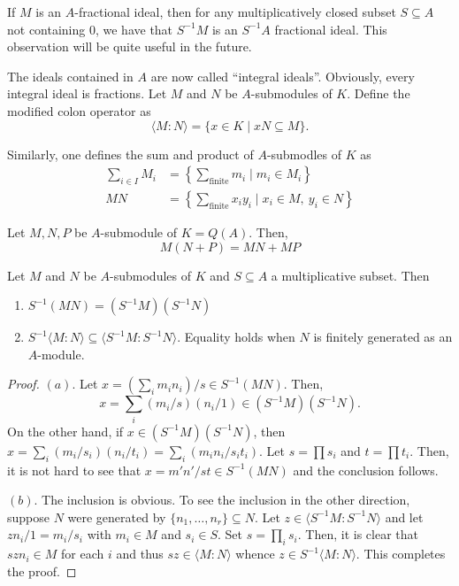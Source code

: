 \begin{remark}
    If $M$ is an $A$-fractional ideal, then for any multiplicatively closed subset $S\subseteq A$ not containing $0$, we have that $S^{-1}M$ is an $S^{-1}A$ fractional ideal. This observation will be quite useful in the future.
\end{remark}

The ideals contained in $A$ are now called ``integral ideals''. Obviously, every integral ideal is fractions. Let $M$ and $N$ be $A$-submodules of $K$. Define the modified colon operator as 
\begin{equation*}
    \langle M: N\rangle = \{x\in K\mid xN\subseteq M\}.
\end{equation*}

Similarly, one defines the sum and product of $A$-submodles of $K$ as 
\begin{align*}
    \sum_{i\in I}M_i &= \left\{\sum_{\text{finite}}m_i\mid m_i\in M_i\right\}\\
    MN &= \left\{\sum_{\text{finite}}x_iy_i\mid x_i\in M,~y_i\in N\right\}
\end{align*}

\begin{proposition}
    Let $M, N, P$ be $A$-submodule of $K = Q(A)$. Then, 
    \begin{equation*}
        M(N + P) = MN + MP
    \end{equation*}
\end{proposition}

\begin{proposition}
    Let $M$ and $N$ be $A$-submodules of $K$ and $S\subseteq A$ a multiplicative subset. Then 
    \begin{enumerate}[label=(\alph*)]
        \item $S^{-1}(MN) = (S^{-1}M)(S^{-1}N)$
        \item $S^{-1}\langle M:N\rangle\subseteq\langle S^{-1}M : S^{-1}N\rangle$. Equality holds when $N$ is finitely generated as an $A$-module.
    \end{enumerate}
\end{proposition}
\begin{proof}
    $(a)$. Let $x = (\sum_i m_in_i)/s\in S^{-1}(MN)$. Then, 
    \begin{equation*}
        x = \sum_{i}(m_i/s)(n_i/1)\in (S^{-1}M)(S^{-1}N).
    \end{equation*}
    On the other hand, if $x\in (S^{-1}M)(S^{-1}N)$, then $x = \sum_i(m_i/s_i)(n_i/t_i) = \sum_i (m_in_i/s_it_i)$. Let $s = \prod s_i$ and $t = \prod t_i$. Then, it is not hard to see that $x = m'n'/st\in S^{-1}(MN)$ and the conclusion follows. 

    $(b)$. The inclusion is obvious. To see the inclusion in the other direction, suppose $N$ were generated by $\{n_1,\dots,n_r\}\subseteq N$. Let $z\in\langle S^{-1}M : S^{-1}N\rangle$ and let $zn_i/1 = m_i/s_i$ with $m_i\in M$ and $s_i\in S$. Set $s = \prod_{i} s_i$. Then, it is clear that $szn_i\in M$ for each $i$ and thus $sz\in\langle M: N\rangle$ whence $z\in S^{-1}\langle M: N\rangle$. This completes the proof.
\end{proof}

